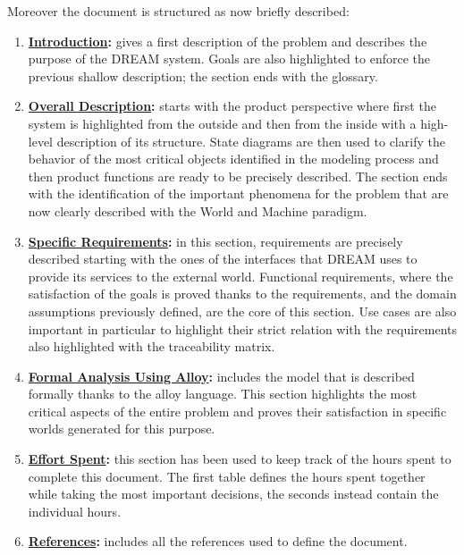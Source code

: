 	Moreover the document is structured as now briefly described:
	\begin{enumerate}
		\item \textbf{\hyperref[sec:introduction]{Introduction}:} gives a first description of the problem and describes the purpose of the DREAM system. Goals are also highlighted to enforce the previous shallow description; the section ends with the glossary.
		
		\item \textbf{\hyperref[sec:overallDescription]{Overall Description}:} starts with the product perspective where first the system is highlighted from the outside and then from the inside with a high-level description of its structure. State diagrams are then used to clarify the behavior of the most critical objects identified in the modeling process and then product functions are ready to be precisely described. The section ends with the identification of the important phenomena for the problem that are now clearly described with the World and Machine paradigm.
		
		\item \textbf{\hyperref[sec:specificRequirements]{Specific Requirements}:} in this section, requirements are precisely described starting with the ones of the interfaces that DREAM uses to provide its services to the external world. Functional requirements, where the satisfaction of the goals is proved thanks to the requirements, and the domain assumptions previously defined, are the core of this section. Use cases are also important in particular to highlight their strict relation with the requirements also highlighted with the traceability matrix.
		
		\item \textbf{\hyperref[sec:formalAnalysisUsingAlloy]{Formal Analysis Using Alloy}:} includes the model that is described formally thanks to the alloy language. This section highlights the most critical aspects of the entire problem and proves their satisfaction in specific worlds generated for this purpose.
		
		\item \textbf{\hyperref[sec:effortSpent]{Effort Spent}:} this section has been used to keep track of the hours spent to complete this document. The first table defines the hours spent together while taking the most important decisions, the seconds instead contain the individual hours.
		
		\item \textbf{\hyperref[sec:references]{References}:} includes all the references used to define the document.
	\end{enumerate}
